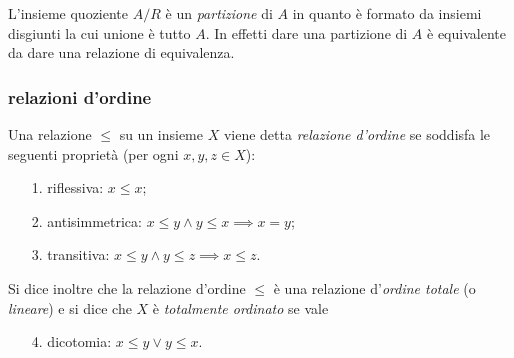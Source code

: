 L'insieme quoziente $A/R$ è un \emph{partizione}%
%
 di $A$ in quanto 
è formato da insiemi disgiunti la cui unione è tutto $A$. In effetti 
dare una partizione di $A$ è equivalente da dare una relazione 
di equivalenza.

\subsubsection{relazioni d'ordine}

\begin{definition}
  \label{def:ordine}%
  Una relazione
  $\le$ su un insieme $X$ viene detta
  \emph{relazione d'ordine}%
%
  se soddisfa le seguenti proprietà (per ogni $x,y,z\in X$):
  \begin{enumerate}
    \item[1.] riflessiva: $x\le x$;
    \item[2.] antisimmetrica: $x\le y \land y\le x \implies x=y$;
    \item[3.] transitiva: $x\le y \land y\le z \implies x\le z$.
  \end{enumerate}
  Si dice inoltre che la relazione d'ordine $\le$
  è una relazione d'\emph{ordine totale}
%
  (o \emph{lineare}) 
  e si dice che $X$ è \emph{totalmente ordinato} se vale
  \begin{enumerate}
    \item[4.] dicotomia: $x\le y \lor y\le x$.
  \end{enumerate}
\end{definition}

